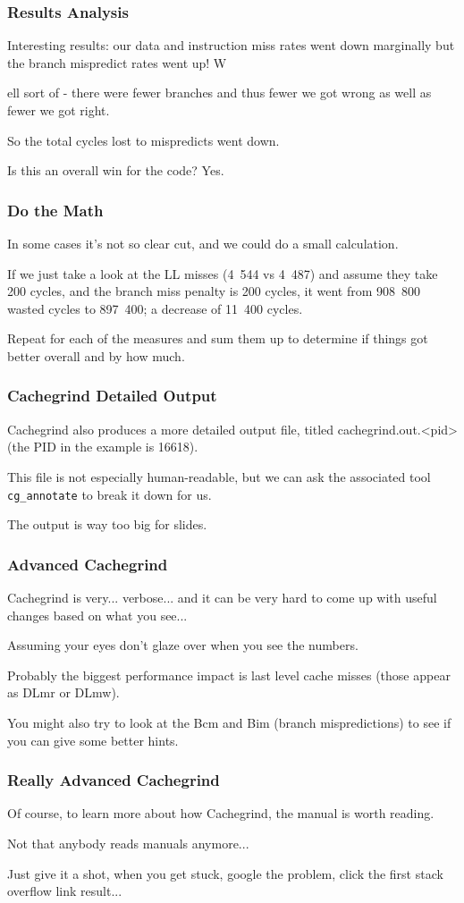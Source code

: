 \begin{frame}
\frametitle{Results Analysis}


Interesting results: our data and instruction miss rates went down marginally but the branch mispredict rates went up! W

ell sort of - there were fewer branches and thus fewer we got wrong as well as fewer we got right. 

So the total cycles lost to mispredicts went down. 

Is this an overall win for the code? Yes. 


\end{frame}
\begin{frame}
\frametitle{Do the Math}

In some cases it's not so clear cut, and we could do a small calculation. 

If we just take a look at the LL misses (4~544 vs 4~487) and assume they take 200 cycles, and the branch miss penalty is 200 cycles, it went from 908~800 wasted cycles to 897~400; a decrease of 11~400 cycles.

  Repeat for each of the measures and sum them up to determine if things got better overall and by how much.

\end{frame}
\begin{frame}
\frametitle{Cachegrind Detailed Output}

Cachegrind also produces a more detailed output file, titled cachegrind.out.<pid> (the PID in the example is 16618). 

This file is not especially human-readable, but we can ask the associated tool \texttt{cg\_annotate} to break it down for us.

The output is way too big for slides.

\end{frame}
\begin{frame}
\frametitle{Advanced Cachegrind}

Cachegrind is very... verbose... and it can be very hard to come up with useful changes based on what you see... 

Assuming your eyes don't glaze over when you see the numbers. 

Probably the biggest performance impact is last level cache misses (those appear as DLmr or DLmw). 

You might also try to look at the Bcm and Bim (branch mispredictions) to see if you can give some better hints. 
\end{frame}
\begin{frame}
\frametitle{Really Advanced Cachegrind}

Of course, to learn more about how Cachegrind, the manual is worth reading. 

Not that anybody reads manuals anymore... 

Just give it a shot, when you get stuck, google the problem, click the first stack overflow link result...


\end{frame}



